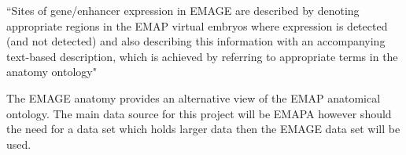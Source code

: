 ``Sites of gene/enhancer expression in EMAGE are described by denoting appropriate regions in the EMAP virtual embryos where expression is detected (and not detected) and also describing this information with an accompanying text-based description, which is achieved by referring to appropriate terms in the anatomy ontology" \cite{emap}

The EMAGE anatomy provides an alternative view of the EMAP anatomical ontology. The main data source for this project will be EMAPA however should the need for a data set which holds larger data then the EMAGE data set will be used.